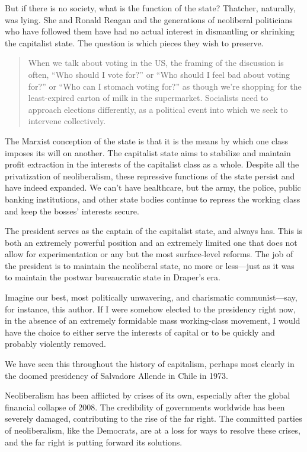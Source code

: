 But if there is no society, what is the function of the state? Thatcher, naturally, was lying. She and Ronald Reagan and the generations of neoliberal politicians who have followed them have had no actual interest in dismantling or shrinking the capitalist state. The question is which pieces they wish to preserve.

\blockquote{When we talk about voting in the US, the framing of the discussion is often, ``Who should I vote for?'' or ``Who should I feel bad about voting for?'' or ``Who can I stomach voting for?'' as though we're shopping for the least-expired carton of milk in the supermarket. Socialists need to approach elections differently, as a political event into which we seek to intervene collectively.}

The Marxist conception of the state is that it is the means by which one class imposes its will on another. The capitalist state aims to stabilize and maintain profit extraction in the interests of the capitalist class as a whole. Despite all the privatization of neoliberalism, these repressive functions of the state persist and have indeed expanded. We can't have healthcare, but the army, the police, public banking institutions, and other state bodies continue to repress the working class and keep the bosses' interests secure.

The president serves as the captain of the capitalist state, and always has. This is both an extremely powerful position and an extremely limited one that does not allow for experimentation or any but the most surface-level reforms. The job of the president is to maintain the neoliberal state, no more or less---just as it was to maintain the postwar bureaucratic state in Draper's era.

Imagine our best, most politically unwavering, and charismatic communist---say, for instance, this author. If I were somehow elected to the presidency right now, in the absence of an extremely formidable mass working-class movement, I would have the choice to either serve the interests of capital or to be quickly and probably violently removed.

We have seen this throughout the history of capitalism, perhaps most clearly in the doomed presidency of Salvadore Allende in Chile in 1973.

Neoliberalism has been afflicted by crises of its own, especially after the global financial collapse of 2008. The credibility of governments worldwide has been severely damaged, contributing to the rise of the far right. The committed parties of neoliberalism, like the Democrats, are at a loss for ways to resolve these crises, and the far right is putting forward its solutions.

